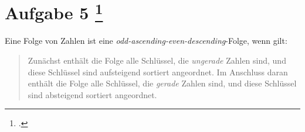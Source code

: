 \documentclass{lehramt-informatik-aufgabe}
\begin{document}
\let\j=\liJavaCode

\section{Aufgabe 5
\footcite{examen:66115:2020:09}}

Eine Folge von Zahlen ist eine
\emph{odd-ascending-even-descending}-Folge, wenn gilt:

\begin{quote}
Zunächst enthält die Folge alle Schlüssel, die \emph{ungerade} Zahlen
sind, und diese Schlüssel sind aufsteigend sortiert angeordnet. Im
Anschluss daran enthält die Folge alle Schlüssel, die \emph{gerade}
Zahlen sind, und diese Schlüssel sind absteigend sortiert angeordnet.
\end{quote}
\end{document}
